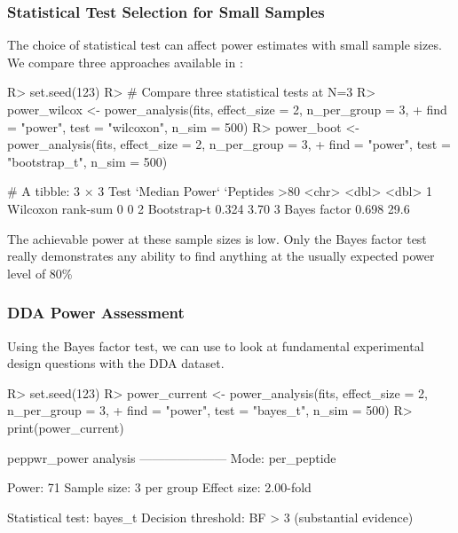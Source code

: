 \documentclass[article]{jss}
\begin{document}
\subsubsection{Statistical Test Selection for Small Samples}

The choice of statistical test can affect power estimates with small sample sizes. We compare three approaches available in :

\begin{Schunk}
\begin{Sinput}
R> set.seed(123)
R> # Compare three statistical tests at N=3
R> power_wilcox <- power_analysis(fits, effect_size = 2, n_per_group = 3,
+                                 find = "power", test = "wilcoxon", n_sim = 500)
R> power_boot <- power_analysis(fits, effect_size = 2, n_per_group = 3,
+                               find = "power", test = "bootstrap_t", n_sim = 500)
\end{Sinput}
\end{Schunk}

\begin{Schunk}
\begin{Soutput}
# A tibble: 3 × 3
  Test              `Median Power` `Peptides >80%
  <chr>                      <dbl>                 <dbl>
1 Wilcoxon rank-sum          0                      0   
2 Bootstrap-t                0.324                  3.70
3 Bayes factor               0.698                 29.6 
\end{Soutput}
\end{Schunk}

The achievable power at these sample sizes is low. Only the Bayes factor test really demonstrates any ability to find anything at the usually expected power level of 80\%

\subsubsection{DDA Power Assessment}

Using the Bayes factor test, we can use  to look at fundamental experimental design questions with the DDA dataset.

\begin{Schunk}
\begin{Sinput}
R> set.seed(123)
R> power_current <- power_analysis(fits, effect_size = 2, n_per_group = 3,
+                                  find = "power", test = "bayes_t", n_sim = 500)
R> print(power_current)
\end{Sinput}
\begin{Soutput}
peppwr_power analysis
---------------------
Mode: per_peptide

Power: 71%
Sample size: 3 per group
Effect size: 2.00-fold

Statistical test: bayes_t
Decision threshold: BF > 3 (substantial evidence)
\end{Soutput}
\end{Schunk}
\end{document}
